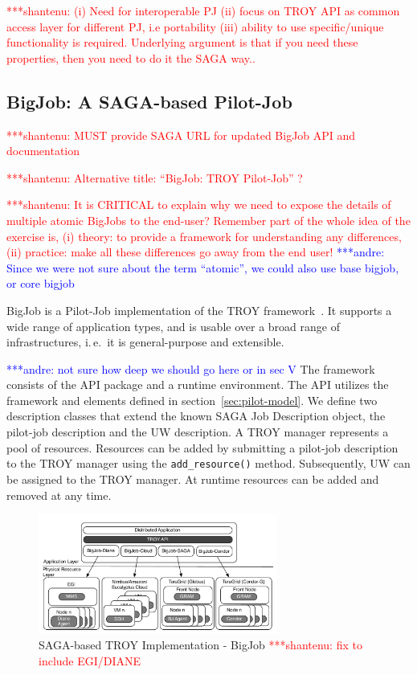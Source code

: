 \documentclass[conference,final]{IEEEtran}
\newcommand{\jhanote}[1]{ {\textcolor{red} { ***shantenu: #1 }}}
\newcommand{\alnote}[1]{ {\textcolor{blue} { ***andre: #1 }}}
\newcommand{\alnote}[1]{}
\newcommand{\jhanote}[1]{}
\begin{document}
\jhanote{(i) Need for interoperable PJ (ii) focus on TROY API as
  common access layer for different PJ, i.e portability (iii) ability
  to use specific/unique functionality is required. Underlying
  argument is that if you need these properties, then you need to do
  it the SAGA way..}

\subsection{BigJob: A SAGA-based Pilot-Job}

\jhanote{MUST provide SAGA URL for updated BigJob API and
  documentation}

\jhanote{Alternative title: ``BigJob: TROY Pilot-Job'' ?}

\jhanote{It is CRITICAL to explain why we need to expose the details
  of multiple atomic BigJobs to the end-user? Remember part of the
  whole idea of the exercise is, (i) theory: to provide a framework
  for understanding any differences, (ii) practice: make all these
  differences go away from the end user!}
\alnote{Since we were not sure about the term ``atomic'', we could also use base 
bigjob, or core bigjob}


BigJob is a Pilot-Job implementation of the TROY
framework~\cite{bigjob_web}. It supports a wide range of application types, and
is usable over a broad range of infrastructures, i.\,e.\ it is general-purpose
and extensible. 

\alnote{not sure how deep we should go here or in sec V}
The framework consists of the API package and a runtime environment. The API
utilizes the framework and elements defined in section~\ref{sec:pilot-model}. We
define two description classes that extend the known SAGA Job Description
object, the pilot-job description and the UW description. A TROY manager
represents a pool of resources. Resources can be added by submitting a pilot-job
description to the TROY manager using the \texttt{add\_resource()} method. 
Subsequently, UW can be assigned to the TROY manager. At runtime resources can 
be added and removed at any time. 


\begin{figure}[htbp]
	\centering
		\includegraphics[width=0.7\textwidth]{figures/distributed_pilot_job.pdf}
	\caption{SAGA-based TROY Implementation - BigJob \jhanote{fix
            to include EGI/DIANE}}
	\label{fig:figures_distributed_pilot_job}
\end{figure}
\end{document}
